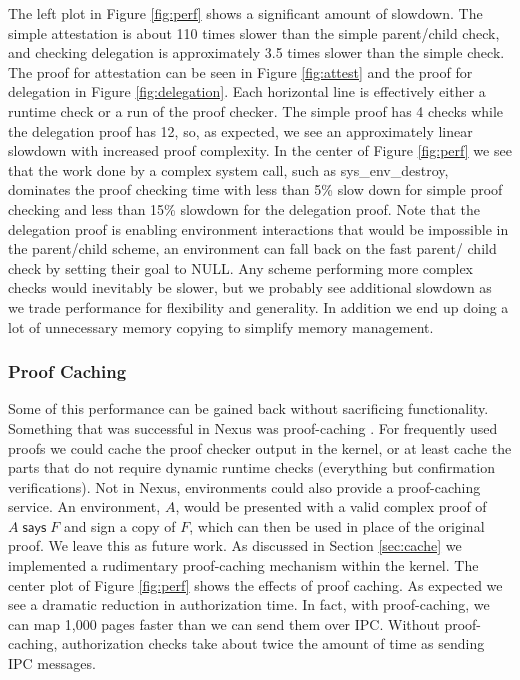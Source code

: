\documentclass[10pt]{article}
\newcommand{\says}[2]{\ensuremath{#1\;\textsf{says}\;#2}}
\begin{document}
\newline\newline
The left plot in Figure \ref{fig:perf} shows a significant amount of slowdown.  The simple attestation is about 110 times slower than the simple parent/child check, and checking delegation is approximately 3.5 times slower than the simple check.  The proof for attestation can be seen in Figure \ref{fig:attest} and the proof for delegation in Figure \ref{fig:delegation}.  Each horizontal line is effectively either a runtime check or a run of the proof checker.  The simple proof has 4 checks while the delegation proof has 12, so, as expected, we see an approximately linear slowdown with increased proof complexity.  In the center of Figure \ref{fig:perf} we see that the work done by a complex system call, such as \textsf{sys\_env\_destroy}, dominates the proof checking time with less than 5\% slow down for simple proof checking and less than 15\% slowdown for the delegation proof.  Note that the delegation proof is enabling environment interactions that would be impossible in the parent/child scheme, an environment can fall back on the fast parent/ child check by setting their goal to \textsf{NULL}.  Any scheme performing more complex checks would inevitably be slower, but we probably see additional slowdown as we trade performance for flexibility and generality.  In addition we end up doing a lot of unnecessary memory copying to simplify memory management.
\subsubsection{Proof Caching}\label{sec:cacheperf}
Some of this performance can be gained back without sacrificing functionality.  Something that was successful in Nexus was proof-caching \cite{Nexus}.  For frequently used proofs we could cache the proof checker output in the kernel, or at least cache the parts that do not require dynamic runtime checks (everything but confirmation verifications).  Not in Nexus, environments could also provide a proof-caching service.  An environment, $A$, would be presented with a valid complex proof of $\says{A}{F}$ and sign a copy of $F$, which can then be used in place of the original proof.  We leave this as future work.
\newline\newline
As discussed in Section \ref{sec:cache} we implemented a rudimentary proof-caching mechanism within the kernel. The center plot of Figure \ref{fig:perf} shows the effects of proof caching.  As expected we see a dramatic reduction in authorization time.  In fact, with proof-caching, we can map 1,000 pages faster than we can send them over IPC.  Without proof-caching, authorization checks take about twice the amount of time as sending IPC messages.
\end{document}
